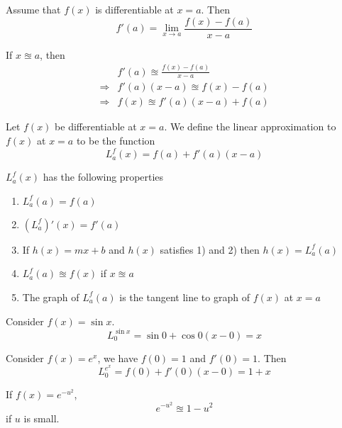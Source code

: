 \begin{note}
Assume that $f(x)$ is differentiable at $x=a$. Then \[f'(a)=\lim_{x\to a}\frac{f(x)-f(a)}{x-a}\]
\end{note}

If $x\approxeq a$, then 
\begin{align*}
    &f'(a) \approxeq \frac{f(x) - f(a)}{x-a}\\
    \Rightarrow & f'(a)(x-a) \approxeq f(x) - f(a) \\
    \Rightarrow & f(x) \approxeq f'(a)(x-a) + f(a)
\end{align*}


\begin{defn}
    Let $f(x)$ be differentiable at $x=a$. We define the linear approximation to $f(x)$ at $x=a$ to be the function \[L_a^f (x) = f(a) + f'(a)(x-a)\]
\end{defn}

\begin{thm}
    $\displaystyle L_a^f (x)$ has the following properties
    \begin{enumerate}
    \item \(\displaystyle L_a^f (a) = f(a)\)
    \item \(\displaystyle (L_a^f)' (x) = f'(a)\)
    \item If $h(x) = mx+b$ and $h(x)$ satisfies 1) and 2) then $\displaystyle h(x)= L_a^f (a)$
    \item $\displaystyle L_a^f (a) \approxeq f(x)$ if $x \approxeq a$
    \item The graph of $L_a^f (a)$ is the tangent line to graph of $f(x)$ at $x=a$
    \end{enumerate}
\end{thm}

\begin{exmp}
Consider $f(x) = \sin x$.
\[L_0^{\sin x} = \sin 0 + \cos 0 (x-0) = x\]
\end{exmp}


\begin{exmp}
Consider $f(x) = e^x$, we have $f(0)=1$ and $f'(0)=1$. Then
\[L_0^{e^x} = f(0) + f'(0)(x-0) = 1+x\]
\end{exmp}

\begin{exmp}
If $f(x) = e^{-u^2}$, \[e^{-u^2} \approxeq 1-u^2\] if $u$ is small. 
\end{exmp}
